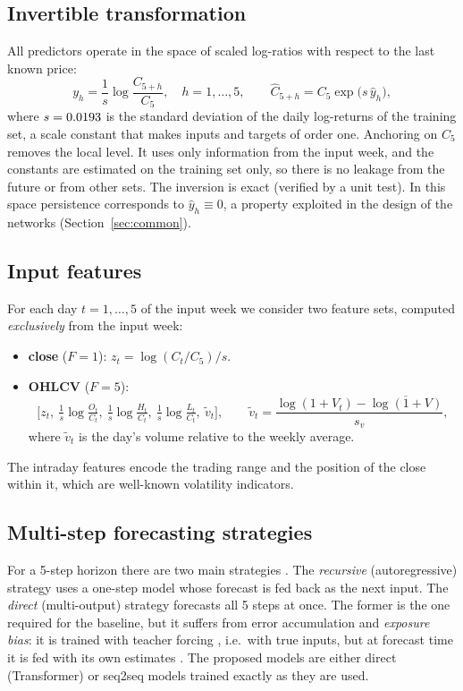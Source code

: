\documentclass[11pt,a4paper]{article}
\newcommand{\yhat}{\hat{y}}
\begin{document}
\subsection{Invertible transformation}
All predictors operate in the space of scaled log-ratios with respect to the last known price:
\begin{equation}
  y_h=\frac{1}{s}\log\frac{C_{5+h}}{C_5},\quad h=1,\dots,5,
  \qquad
  \hat C_{5+h}=C_5\exp\!\big(s\,\yhat_h\big),
  \label{eq:target}
\end{equation}
where $s=0.0193$ is the standard deviation of the daily log-returns of the training set, a scale constant that makes inputs and targets of order one. Anchoring on $C_5$ removes the local level. It uses only information from the input week, and the constants are estimated on the training set only, so there is no leakage from the future or from other sets. The inversion is exact (verified by a unit test). In this space persistence corresponds to $\yhat_h\equiv0$, a property exploited in the design of the networks (Section~\ref{sec:common}).

\subsection{Input features}
For each day $t=1,\dots,5$ of the input week we consider two feature sets, computed \emph{exclusively} from the input week:
\begin{itemize}[leftmargin=*]
  \item \textbf{close} ($F=1$): $z_t=\log(C_t/C_5)/s$.
  \item \textbf{OHLCV} ($F=5$):
  \[
    \Big[z_t,\ \tfrac1s\log\tfrac{O_t}{C_t},\ \tfrac1s\log\tfrac{H_t}{C_t},\ \tfrac1s\log\tfrac{L_t}{C_t},\ \tilde v_t\Big],
    \qquad \tilde v_t=\frac{\log(1+V_t)-\overline{\log(1+V)}}{s_v},
  \]
  where $\tilde v_t$ is the day's volume relative to the weekly average.
\end{itemize}
The intraday features encode the trading range and the position of the close within it, which are well-known volatility indicators.

\subsection{Multi-step forecasting strategies}
For a 5-step horizon there are two main strategies \cite{bentaieb2012}. The \emph{recursive} (autoregressive) strategy uses a one-step model whose forecast is fed back as the next input. The \emph{direct} (multi-output) strategy forecasts all 5 steps at once. The former is the one required for the baseline, but it suffers from error accumulation and \emph{exposure bias}: it is trained with teacher forcing \cite{williams1989}, i.e.\ with true inputs, but at forecast time it is fed with its own estimates \cite{bengio2015}. The proposed models are either direct (Transformer) or seq2seq models trained exactly as they are used.
\end{document}

